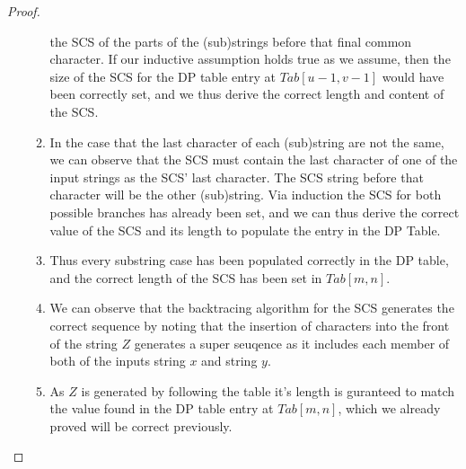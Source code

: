 \documentclass{article}
\begin{document}
\begin{proof}
\begin{enumerate}
\begin{enumerate}
                              the SCS of the parts of the (sub)strings before that final
                              common character. If our inductive assumption holds true as
                              we assume, then the size of the SCS for the DP table entry
                              at $Tab[u-1,v-1]$ would have been correctly set, and we thus
                              derive the correct length and content of the SCS.
                        \item In the case that the last character of each (sub)string are
                              not the same, we can observe that the SCS must contain the last
                              character of one of the input strings as the SCS' last
                              character. The SCS string before that character will be the
                              other (sub)string. Via induction the SCS for both possible
                              branches has already been set, and we can thus derive the
                              correct value of the SCS and its length to populate the
                              entry in the DP Table.
                        \item Thus every substring case has been populated correctly in
                              the DP table, and the correct length of the SCS has been set in
                              $Tab[m,n]$.
                        \item We can observe that the backtracing algorithm for the SCS
                              generates the correct sequence by noting that the insertion of
                              characters into the front of the string $Z$ generates a super
                              seuqence as it includes each member of both of the inputs string $x$ and
                              string $y$.
                        \item As $Z$ is generated by following the table it's
                              length is guranteed to match the value found in the DP table
                              entry at $Tab[m,n]$, which we already proved will be correct
                              previously.
                  \end{enumerate}
      \end{enumerate}


\end{proof}
\end{document}
